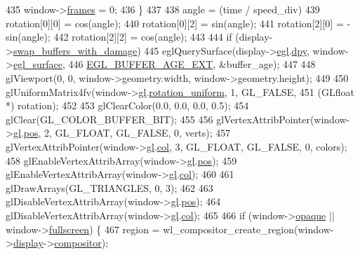 \begin{DoxyCode}
{435         window->\hyperlink{structwindow_a633864bb495ec265bee220a5c70cc98f}{frames} = 0;
436     \}
437 
438     angle = (time / speed\_div) %
439     rotation[0][0] =  cos(angle);
440     rotation[0][2] =  sin(angle);
441     rotation[2][0] = -sin(angle);
442     rotation[2][2] =  cos(angle);
443 
444     \textcolor{keywordflow}{if} (display->\hyperlink{structdisplay_a48c46c118e4765ef06596f6341c8f23f}{swap\_buffers\_with\_damage})
445         eglQuerySurface(display->\hyperlink{structdisplay_a8b8bc104c19ff228d476a377e572d9c7}{egl}.\hyperlink{structdisplay_a8a1cbda15a286e41e89a85f158ce9311}{dpy}, window->\hyperlink{structwindow_a8de0059f3f1cb0dec33fba1143b7dee1}{egl\_surface},
446                 \hyperlink{simple-egl_8cpp_a7045d8a6b4857f268a62fab2de2021fd}{EGL\_BUFFER\_AGE\_EXT}, &buffer\_age);
447 
448     glViewport(0, 0, window->geometry.width, window->geometry.height);
449 
450     glUniformMatrix4fv(window->\hyperlink{structwindow_a6975a930e9a3c166f8201fc4ef5e7728}{gl}.\hyperlink{structwindow_a5202f3b60e262a6fa4fcee68dd47cb67}{rotation\_uniform}, 1, GL\_FALSE,
451                (GLfloat *) rotation);
452 
453     glClearColor(0.0, 0.0, 0.0, 0.5);
454     glClear(GL\_COLOR\_BUFFER\_BIT);
455 
456     glVertexAttribPointer(window->\hyperlink{structwindow_a6975a930e9a3c166f8201fc4ef5e7728}{gl}.\hyperlink{structwindow_aaf965f90f9fc938db2315ff62028c362}{pos}, 2, GL\_FLOAT, GL\_FALSE, 0, verts);
457     glVertexAttribPointer(window->\hyperlink{structwindow_a6975a930e9a3c166f8201fc4ef5e7728}{gl}.\hyperlink{structwindow_aef10fe94766ccd4831ee611c5ad0e55c}{col}, 3, GL\_FLOAT, GL\_FALSE, 0, colors);
458     glEnableVertexAttribArray(window->\hyperlink{structwindow_a6975a930e9a3c166f8201fc4ef5e7728}{gl}.\hyperlink{structwindow_aaf965f90f9fc938db2315ff62028c362}{pos});
459     glEnableVertexAttribArray(window->\hyperlink{structwindow_a6975a930e9a3c166f8201fc4ef5e7728}{gl}.\hyperlink{structwindow_aef10fe94766ccd4831ee611c5ad0e55c}{col});
460 
461     glDrawArrays(GL\_TRIANGLES, 0, 3);
462 
463     glDisableVertexAttribArray(window->\hyperlink{structwindow_a6975a930e9a3c166f8201fc4ef5e7728}{gl}.\hyperlink{structwindow_aaf965f90f9fc938db2315ff62028c362}{pos});
464     glDisableVertexAttribArray(window->\hyperlink{structwindow_a6975a930e9a3c166f8201fc4ef5e7728}{gl}.\hyperlink{structwindow_aef10fe94766ccd4831ee611c5ad0e55c}{col});
465 
466     \textcolor{keywordflow}{if} (window->\hyperlink{structwindow_a026a50808d8323a5a73d585c19916fa8}{opaque} || window->\hyperlink{structwindow_a8da44798a9e1feb7ed3fbd18ec3a28b6}{fullscreen}) \{
467         region = wl\_compositor\_create\_region(window->\hyperlink{structwindow_a129486f2bd23791194f389ca1405cfd4}{display}->\hyperlink{structdisplay_a41ba32dfde812165dda5b62885000c78}{compositor});
}
\end{DoxyCode}
